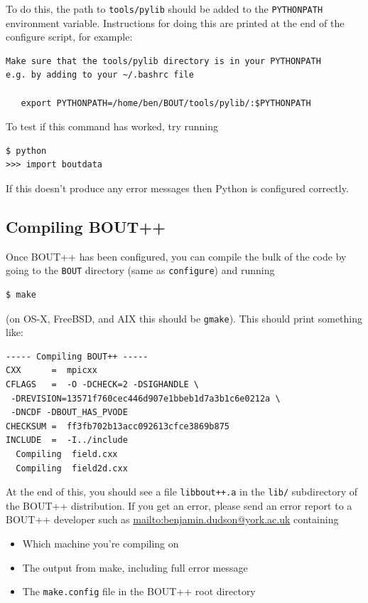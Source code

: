 \documentclass[12pt]{article}
\begin{document}
To do this, the path to
\texttt{tools/pylib} should be added to the \texttt{PYTHONPATH} environment variable.
Instructions for doing this are printed at the end of the configure script, for example:

\begin{verbatim}
Make sure that the tools/pylib directory is in your PYTHONPATH
e.g. by adding to your ~/.bashrc file

   export PYTHONPATH=/home/ben/BOUT/tools/pylib/:$PYTHONPATH

\end{verbatim}
To test if this command has worked, try running
\begin{verbatim}
$ python
>>> import boutdata
\end{verbatim}
If this doesn't produce any error messages then Python is configured correctly.

\subsection{Compiling BOUT++}
\label{sec:installbout}

Once BOUT++ has been configured, you can compile the bulk of the code
by going to the \texttt{BOUT} directory (same as \texttt{configure}) and running
\begin{verbatim}
$ make
\end{verbatim}
(on OS-X, FreeBSD, and AIX this should be \texttt{gmake}). This should print something like:
\begin{verbatim}
----- Compiling BOUT++ -----
CXX      =  mpicxx
CFLAGS   =  -O -DCHECK=2 -DSIGHANDLE \
 -DREVISION=13571f760cec446d907e1bbeb1d7a3b1c6e0212a \
 -DNCDF -DBOUT_HAS_PVODE
CHECKSUM =  ff3fb702b13acc092613cfce3869b875
INCLUDE  =  -I../include
  Compiling  field.cxx
  Compiling  field2d.cxx
\end{verbatim}

At the end of this, you should see a file \texttt{libbout++.a} in
the \texttt{lib/} subdirectory of the BOUT++ distribution. If you
get an error, please send an error report to a BOUT++ developer
such as \url{mailto:benjamin.dudson@york.ac.uk} containing
\begin{itemize}
\item Which machine you're compiling on
\item The output from make, including full error message
\item The \texttt{make.config} file in the BOUT++ root directory
\end{itemize}
\end{document}
